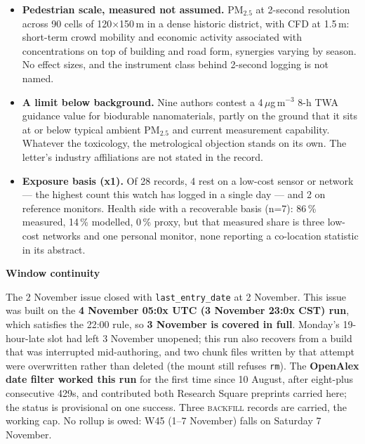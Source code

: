 \documentclass[10pt]{article}
\begin{document}
\begin{itemize}
\item \textbf{Pedestrian scale, measured not assumed.} PM$_{2.5}$ at 2-second resolution across 90 cells of 120$\times$150\,m in a dense historic district, with CFD at 1.5\,m: short-term crowd mobility and economic activity associated with concentrations on top of building and road form, synergies varying by season. No effect sizes, and the instrument class behind 2-second logging is not named.

\item \textbf{A limit below background.} Nine authors contest a 4\,$\mu$g\,m$^{-3}$ 8-h TWA guidance value for biodurable nanomaterials, partly on the ground that it sits at or below typical ambient PM$_{2.5}$ and current measurement capability. Whatever the toxicology, the metrological objection stands on its own. The letter's industry affiliations are not stated in the record.

\item \textbf{Exposure basis (x1).} Of 28 records, 4 rest on a low-cost sensor or network --- the highest count this watch has logged in a single day --- and 2 on reference monitors. Health side with a recoverable basis (n=7): 86\,\% measured, 14\,\% modelled, 0\,\% proxy, but that measured share is three low-cost networks and one personal monitor, none reporting a co-location statistic in its abstract.

\end{itemize}

\vspace{2mm}

\begin{keybox}
{\sffamily\bfseries\footnotesize\color{Deep}Window continuity}\\[1.2mm]
{\fontsize{7.2}{8.8}\selectfont
The 2 November issue closed with \texttt{last\_entry\_date} at 2 November. This issue was built on the \textbf{4 November 05:0x UTC (3 November 23:0x CST) run}, which satisfies the 22:00 rule, so \textbf{3 November is covered in full}. Monday's 19-hour-late slot had left 3 November unopened; this run also recovers from a build that was interrupted mid-authoring, and two chunk files written by that attempt were overwritten rather than deleted (the mount still refuses \texttt{rm}). The \textbf{OpenAlex date filter worked this run} for the first time since 10 August, after eight-plus consecutive 429s, and contributed both Research Square preprints carried here; the status is provisional on one success. Three \textsc{backfill} records are carried, the working cap. No rollup is owed: W45 (1--7 November) falls on Saturday 7 November.\par}
\end{keybox}
\end{document}
